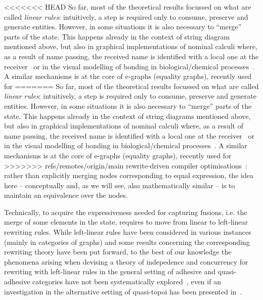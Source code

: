 \documentclass[a4paper,UKenglish,cleveref,pdftex,thm-restate,numberwithinsect,anonymous]{lipics}
\begin{document}
<<<<<<< HEAD
So far, most of the theoretical results focussed on what are called \emph{linear rules}: 
intuitively, a step is required only to consume, preserve and generate entities. 
However, in some situations it is also necessary to ``merge'' parts of the state. 
This happens already in the context of string diagram mentioned above, but also 
in graphical implementations of nominal calculi where, as a result of name passing, 
the received name is identified with a local one at the
receiver~\cite{CVY:ESSPE,Gad07} or in the visual modelling of bonding in
biological/chemical processes~\cite{PUY:MBPE}. A similar mechanisms is
at the core of e-graphs (equality graphs), recently used for
=======
So far, most of the theoretical results focussed on what are called
\emph{linear rules}: intuitively, a step is required only to consume,
preserve and generate entities.  However, in some situations it is
also necessary to ``merge'' parts of the state.  This happens already
in the context of string diagrams mentioned above, but also in
graphical implementations of nominal calculi where, as a result of
name passing, the received name is identified with a local one at the
receiver~\cite{CVY:ESSPE,Gad07} or in the visual modelling of bonding
in biological/chemical processes~\cite{PUY:MBPE}. A similar mechanisms
is at the core of e-graphs (equality graphs), recently used for
>>>>>>> refs/remotes/origin/main
rewrite-driven compiler optimisations~\cite{WNW:egg}: rather than
explicitly merging nodes corresponding to equal expression, the idea
here -- conceptually and, as we will see, also mathematically similar --
is to maintain an equivalence %
over the nodes.  


Technically, to acquire the expressiveness needed for capturing
fusions, i.e. the merge of some elements in the state, requires to
move from linear to left-linear rewriting rules. While left-linear
rules have been considered in various instances (mainly in categories
of graphs) and some results concerning the corresponding rewriting
theory have been put forward, to the best of our knowledge the
phenomena arising when devising a theory of indepedence and
concurrency for rewriting with left-linear rules in the general
setting of adhesive and quasi-adhesive categories
have not been systematically
explored~\cite{Ehrig1976,EHP:BRfTToHLRS,baldan2011adhesivity},
even if an investigation in the alternative setting of quasi-topoi has 
been presented in~\cite{BehrHK23}.
\end{document}
